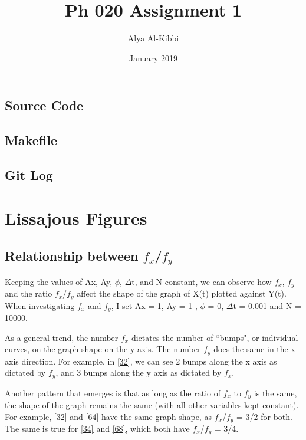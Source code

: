 \documentclass{article}
\title{Ph 020 Assignment 1}
\author{Alya Al-Kibbi}
\date{January 2019}
\begin{document}
\maketitle

\subsection{Source Code}



\subsection{Makefile}



\subsection{Git Log}



\section{Lissajous Figures}

\subsection{Relationship between $f_x$/$f_y$}

Keeping the values of Ax, Ay, $\phi$, $\Delta$t, and N constant, we can observe how $f_x$, $f_y$ and the ratio $f_x$/$f_y$ affect the shape of the graph of X(t) plotted against Y(t). When investigating $f_x$ and $f_y$, I set Ax = 1, Ay = 1 , $\phi$ = 0, $\Delta$t = 0.001 and N = 10000. 

As a general trend, the number $f_x$ dictates the number of ``bumps", or individual curves, on the graph shape on the y axis. The number $f_y$ does the same in the x axis direction. For example, in \ref{32}, we can see 2 bumps along the x axis as dictated by $f_y$, and 3 bumps along the y axis as dictated by $f_x$.

Another pattern that emerges is that as long as the ratio of $f_x$ to $f_y$ is the same, the shape of the graph remains the same (with all other variables kept constant). For example, \ref{32} and \ref{64} have the same graph shape, as $f_x$/$f_y$ = 3/2 for both. The same is true for \ref{34} and \ref{68}, which both have $f_x$/$f_y$ = 3/4. 
\end{document}
